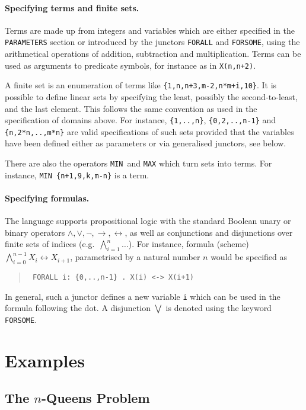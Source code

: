 \documentclass[twoside]{article}
\begin{document}
\paragraph*{Specifying terms and finite sets.} 
Terms are made up from integers and variables which are either specified in the \texttt{PARAMETERS} section or introduced by the junctors 
\texttt{FORALL} and \texttt{FORSOME}, using the arithmetical operations of addition, subtraction and multiplication. Terms can be used
as arguments to predicate symbols, for instance as in \texttt{X(n,n+2)}.

A finite set is an enumeration of terms like \texttt{\{1,n,n+3,m-2,n*m+i,10\}}. It is possible to define linear sets by specifying the
least, possibly the second-to-least, and the last element. This follows the same convention as used in the specification of domains
above. For instance, \texttt{\{1,..,n\}}, \texttt{\{0,2,..,n-1\}} and \texttt{\{n,2*n,..,m*n\}} are valid specifications of such sets
provided that the variables have been defined either as parameters or via generalised junctors, see below.

There are also the operators \texttt{MIN} and \texttt{MAX} which turn sets into terms. For instance, \texttt{MIN \{n+1,9,k,m-n\}} is a term.


\paragraph*{Specifying formulas.}
The \DiMo language supports propositional logic with the standard Boolean unary or binary operators $\wedge,\vee,\neg,\to,\leftrightarrow$, 
as well as conjunctions and disjunctions over finite sets of indices (e.g.\ $\bigwedge_{i=1}^n \ldots$). For instance, formula (scheme)
$\bigwedge_{i=0}^{n-1} X_i \leftrightarrow X_{i+1}$, parametrised by a natural number $n$ would be specified as
\begin{quote} \tt
  FORALL i: \{0,..,n-1\} . X(i) <-> X(i+1)
\end{quote}
In general, such a junctor defines a new variable \texttt{i} which can be used in the formula following the dot. A disjunction $\bigvee$ 
is denoted using the keyword \texttt{FORSOME}.


 


\section{Examples}

\subsection{The $n$-Queens Problem}
\end{document}
